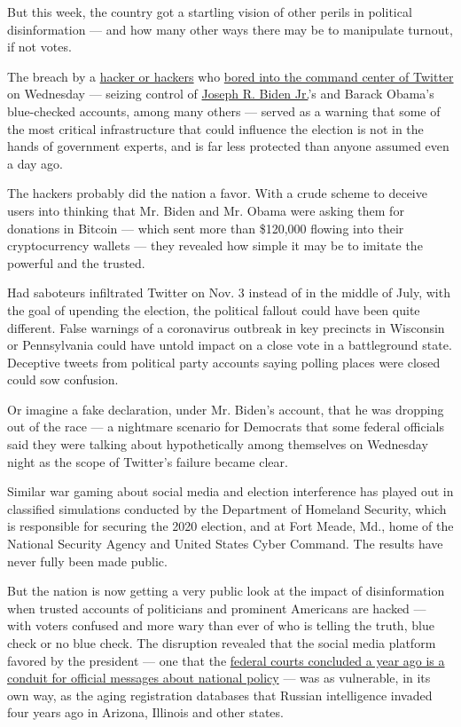 But this week, the country got a startling vision of other perils in
political disinformation --- and how many other ways there may be to
manipulate turnout, if not votes.

The breach by a
\href{https://www.nytimes.com/2020/07/17/technology/twitter-hackers-interview.html}{hacker
or hackers} who
\href{https://www.nytimes.com/2020/07/15/technology/twitter-hack-bill-gates-elon-musk.html}{bored
into the command center of Twitter} on Wednesday --- seizing control of
\href{https://www.nytimes.com/interactive/2020/us/elections/joe-biden.html}{Joseph
R. Biden Jr.}'s and Barack Obama's blue-checked accounts, among many
others --- served as a warning that some of the most critical
infrastructure that could influence the election is not in the hands of
government experts, and is far less protected than anyone assumed even a
day ago.

The hackers probably did the nation a favor. With a crude scheme to
deceive users into thinking that Mr. Biden and Mr. Obama were asking
them for donations in Bitcoin --- which sent more than \$120,000 flowing
into their cryptocurrency wallets --- they revealed how simple it may be
to imitate the powerful and the trusted.

Had saboteurs infiltrated Twitter on Nov. 3 instead of in the middle of
July, with the goal of upending the election, the political fallout
could have been quite different. False warnings of a coronavirus
outbreak in key precincts in Wisconsin or Pennsylvania could have untold
impact on a close vote in a battleground state. Deceptive tweets from
political party accounts saying polling places were closed could sow
confusion.

Or imagine a fake declaration, under Mr. Biden's account, that he was
dropping out of the race --- a nightmare scenario for Democrats that
some federal officials said they were talking about hypothetically among
themselves on Wednesday night as the scope of Twitter's failure became
clear.

Similar war gaming about social media and election interference has
played out in classified simulations conducted by the Department of
Homeland Security, which is responsible for securing the 2020 election,
and at Fort Meade, Md., home of the National Security Agency and United
States Cyber Command. The results have never fully been made public.

But the nation is now getting a very public look at the impact of
disinformation when trusted accounts of politicians and prominent
Americans are hacked --- with voters confused and more wary than ever of
who is telling the truth, blue check or no blue check. The disruption
revealed that the social media platform favored by the president --- one
that the
\href{https://www.nytimes.com/2019/07/09/us/politics/trump-twitter-first-amendment.html}{federal
courts concluded a year ago is a conduit for official messages about
national policy} --- was as vulnerable, in its own way, as the aging
registration databases that Russian intelligence invaded four years ago
in Arizona, Illinois and other states.

